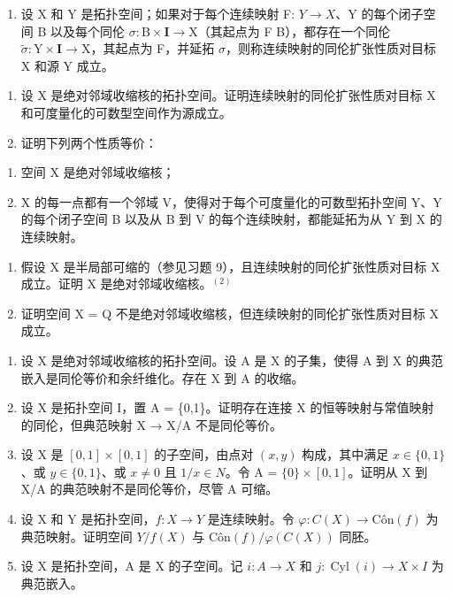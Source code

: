 \begin{enumerate}
\def\labelenumi{\arabic{enumi})}
\setcounter{enumi}{11}
\tightlist
\item
  设 X 和 Y 是拓扑空间；如果对于每个连续映射 F: \(Y \rightarrow X\)、Y 的每个闭子空间 B 以及每个同伦 \(\sigma\colon\mathrm{B}\times\mathbf{I}\to\mathrm{X}\)（其起点为 F \textbar{} B），都存在一个同伦 \(\widetilde{\sigma}\colon\mathrm{Y}\times\mathbf{I}\to\mathrm{X}\)，其起点为 F，并延拓 \(\sigma\)，则称连续映射的同伦扩张性质对目标 X 和源 Y 成立。
\end{enumerate}

\begin{enumerate}
\def\labelenumi{\alph{enumi})}
\item
  设 X 是绝对邻域收缩核的拓扑空间。证明连续映射的同伦扩张性质对目标 X 和可度量化的可数型空间作为源成立。
\item
  证明下列两个性质等价：
\end{enumerate}

\begin{enumerate}
\def\labelenumi{(\roman{enumi})}
\item
  空间 X 是绝对邻域收缩核；
\item
  X 的每一点都有一个邻域 V，使得对于每个可度量化的可数型拓扑空间 Y、Y 的每个闭子空间 B 以及从 B 到 V 的每个连续映射，都能延拓为从 Y 到 X 的连续映射。
\end{enumerate}

\begin{enumerate}
\def\labelenumi{\alph{enumi})}
\setcounter{enumi}{2}
\item
  假设 X 是半局部可缩的（参见习题 9），且连续映射的同伦扩张性质对目标 X 成立。证明 X 是绝对邻域收缩核。\(^{(2)}\)
\item
  证明空间 X = Q 不是绝对邻域收缩核，但连续映射的同伦扩张性质对目标 X 成立。
\end{enumerate}

\begin{enumerate}
\def\labelenumi{\arabic{enumi})}
\setcounter{enumi}{12}
\item
  设 X 是绝对邻域收缩核的拓扑空间。设 A 是 X 的子集，使得 A 到 X 的典范嵌入是同伦等价和余纤维化。存在 X 到 A 的收缩。
\item
  设 X 是拓扑空间 I，置 A = \{0,1\}。证明存在连接 X 的恒等映射与常值映射的同伦，但典范映射 X → X/A 不是同伦等价。
\item
  设 X 是 \([0,1]\times[0,1]\) 的子空间，由点对 \((x,y)\) 构成，其中满足 \(x\in\{0,1\}\)、或 \(y\in\{0,1\}\)、或 \(x\neq0\) 且 \(1/x\in N\)。令 A = \(\{0\}\times[0,1]\)。证明从 X 到 X/A 的典范映射不是同伦等价，尽管 A 可缩。
\item
  设 X 和 Y 是拓扑空间，\(f: X \to Y\) 是连续映射。令 \(\varphi: C(X) \to \text{Côn}(f)\) 为典范映射。证明空间 \(Y/f(X)\) 与 \(\text{Côn}(f)/\varphi(C(X))\) 同胚。
\item
  设 X 是拓扑空间，A 是 X 的子空间。记 \(i\colon A \to X\) 和 \(j\colon \operatorname{Cyl}(i) \to X \times I\) 为典范嵌入。
\end{enumerate}

